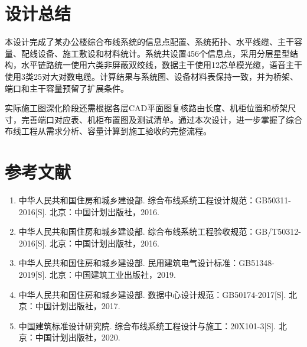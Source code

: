 \documentclass[UTF8,a4paper,12pt]{ctexart}
\begin{document}
\section{设计总结}
本设计完成了某办公楼综合布线系统的信息点配置、系统拓扑、水平线缆、主干容量、配线设备、施工敷设和材料统计。系统共设置456个信息点，采用分层星型结构，水平链路统一使用六类非屏蔽双绞线，数据主干使用12芯单模光缆，语音主干使用3类25对大对数电缆。计算结果与系统图、设备材料表保持一致，并为桥架、端口和主干容量预留了扩展条件。

实际施工图深化阶段还需根据各层CAD平面图复核路由长度、机柜位置和桥架尺寸，完善端口对应表、机柜布置图及测试清单。通过本次设计，进一步掌握了综合布线工程从需求分析、容量计算到施工验收的完整流程。

\section*{参考文献}
\begin{enumerate}
\item 中华人民共和国住房和城乡建设部. 综合布线系统工程设计规范：GB50311-2016[S]. 北京：中国计划出版社，2016.
\item 中华人民共和国住房和城乡建设部. 综合布线系统工程验收规范：GB/T50312-2016[S]. 北京：中国计划出版社，2016.
\item 中华人民共和国住房和城乡建设部. 民用建筑电气设计标准：GB51348-2019[S]. 北京：中国建筑工业出版社，2019.
\item 中华人民共和国住房和城乡建设部. 数据中心设计规范：GB50174-2017[S]. 北京：中国计划出版社，2017.
\item 中国建筑标准设计研究院. 综合布线系统工程设计与施工：20X101-3[S]. 北京：中国计划出版社，2020.
\end{enumerate}
\end{document}
